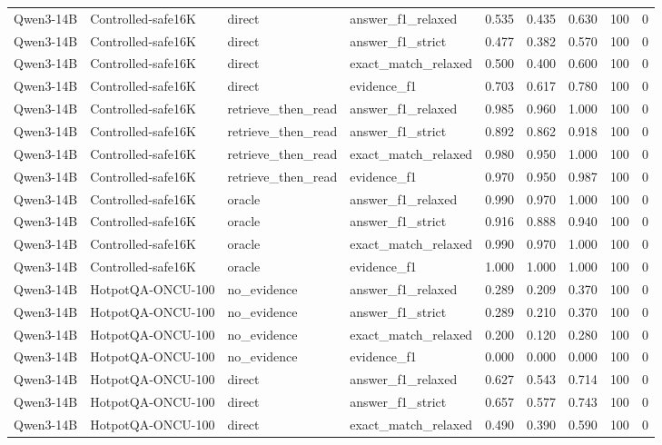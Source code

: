 \begin{tabular}{llllrrrrr}
Qwen3-14B & Controlled-safe16K & direct & answer_f1_relaxed & 0.535 & 0.435 & 0.630 & 100 & 0 \\
Qwen3-14B & Controlled-safe16K & direct & answer_f1_strict & 0.477 & 0.382 & 0.570 & 100 & 0 \\
Qwen3-14B & Controlled-safe16K & direct & exact_match_relaxed & 0.500 & 0.400 & 0.600 & 100 & 0 \\
Qwen3-14B & Controlled-safe16K & direct & evidence_f1 & 0.703 & 0.617 & 0.780 & 100 & 0 \\
Qwen3-14B & Controlled-safe16K & retrieve_then_read & answer_f1_relaxed & 0.985 & 0.960 & 1.000 & 100 & 0 \\
Qwen3-14B & Controlled-safe16K & retrieve_then_read & answer_f1_strict & 0.892 & 0.862 & 0.918 & 100 & 0 \\
Qwen3-14B & Controlled-safe16K & retrieve_then_read & exact_match_relaxed & 0.980 & 0.950 & 1.000 & 100 & 0 \\
Qwen3-14B & Controlled-safe16K & retrieve_then_read & evidence_f1 & 0.970 & 0.950 & 0.987 & 100 & 0 \\
Qwen3-14B & Controlled-safe16K & oracle & answer_f1_relaxed & 0.990 & 0.970 & 1.000 & 100 & 0 \\
Qwen3-14B & Controlled-safe16K & oracle & answer_f1_strict & 0.916 & 0.888 & 0.940 & 100 & 0 \\
Qwen3-14B & Controlled-safe16K & oracle & exact_match_relaxed & 0.990 & 0.970 & 1.000 & 100 & 0 \\
Qwen3-14B & Controlled-safe16K & oracle & evidence_f1 & 1.000 & 1.000 & 1.000 & 100 & 0 \\
Qwen3-14B & HotpotQA-ONCU-100 & no_evidence & answer_f1_relaxed & 0.289 & 0.209 & 0.370 & 100 & 0 \\
Qwen3-14B & HotpotQA-ONCU-100 & no_evidence & answer_f1_strict & 0.289 & 0.210 & 0.370 & 100 & 0 \\
Qwen3-14B & HotpotQA-ONCU-100 & no_evidence & exact_match_relaxed & 0.200 & 0.120 & 0.280 & 100 & 0 \\
Qwen3-14B & HotpotQA-ONCU-100 & no_evidence & evidence_f1 & 0.000 & 0.000 & 0.000 & 100 & 0 \\
Qwen3-14B & HotpotQA-ONCU-100 & direct & answer_f1_relaxed & 0.627 & 0.543 & 0.714 & 100 & 0 \\
Qwen3-14B & HotpotQA-ONCU-100 & direct & answer_f1_strict & 0.657 & 0.577 & 0.743 & 100 & 0 \\
Qwen3-14B & HotpotQA-ONCU-100 & direct & exact_match_relaxed & 0.490 & 0.390 & 0.590 & 100 & 0 \\

\end{tabular}
